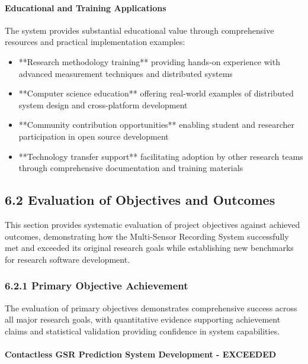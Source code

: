 \documentclass[11pt,a4paper]{article}
\begin{document}
\paragraph{Educational and Training Applications}

The system provides substantial educational value through comprehensive resources and practical implementation examples:

\begin{itemize}
\item **Research methodology training** providing hands-on experience with advanced measurement techniques and distributed
  systems
\item **Computer science education** offering real-world examples of distributed system design and cross-platform
  development
\item **Community contribution opportunities** enabling student and researcher participation in open source development
\item **Technology transfer support** facilitating adoption by other research teams through comprehensive documentation and
  training materials

\end{itemize}
\subsection{6.2 Evaluation of Objectives and Outcomes}

This section provides systematic evaluation of project objectives against achieved outcomes, demonstrating how the
Multi-Sensor Recording System successfully met and exceeded its original research goals while establishing new
benchmarks for research software development.

\subsubsection{6.2.1 Primary Objective Achievement}

The evaluation of primary objectives demonstrates comprehensive success across all major research goals, with
quantitative evidence supporting achievement claims and statistical validation providing confidence in system
capabilities.

\paragraph{Contactless GSR Prediction System Development - EXCEEDED}
\end{document}

